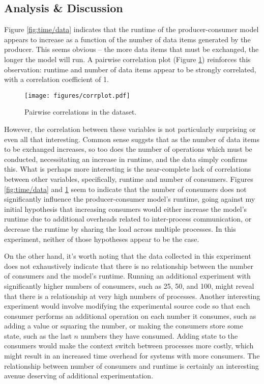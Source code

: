 \documentclass[12pt,a4paper]{article}
\begin{document}
 		\subsection{Analysis \& Discussion}

 			Figure \ref{fig:time/data} indicates that the runtime of the producer-consumer model appears to increase as a function of the number of data items generated by the producer. This seems obvious -- the more data items that must be exchanged, the longer the model will run. A pairwise correlation plot (Figure \ref{fig:corr}) reinforces this observation: runtime and number of data items appear to be strongly correlated, with a correlation coefficient of 1.
				 \begin{figure}[H]
					\centerline{\texttt{[image: figures/corrplot.pdf]}}
					\caption{Pairwise correlations in the dataset.}
					\label{fig:corr}
				\end{figure}

 			However, the correlation between these variables is not particularly surprising or even all that interesting. Common sense suggsts that as the number of data items to be exchanged increases, so too does the number of operations which must be conducted, necessitating an increase in runtime, and the data simply confirms this. What is perhaps more interesting is the near-complete lack of correlations between other variables, specifically, runtime and number of consumers. Figures \ref{fig:time/data} and \ref{fig:corr} seem to indicate that the number of consumers does not significantly influence the producer-consumer model's runtime, going against my initial hypothesis that increasing consumers would either increase the model's runtime due to additional overheads related to inter-process communication, or decrease the runtime by sharing the load across multiple processes. In this experiment, neither of those hypotheses appear to be the case.

 			On the other hand, it's worth noting that the data collected in this experiment does not exhaustively indicate that there is no relationship between the number of consumers and the model's runtime. Running an additional experiment with significantly higher numbers of consumers, such as 25, 50, and 100, might reveal that there is a relationship at very high numbers of processes. Another interesting experiment would involve modifying the experimental source code so that each consumer performs an additional operation on each number it consumes, such as adding a value or squaring the number, or making the consumers store some state, such as the last $n$ numbers they have consumed. Adding state to the consumers would make the context switch between processes more costly, which might result in an increased time overhead for systems with more consumers. The relationship between number of consumers and runtime is certainly an interesting avenue deserving of additional experimentation.
\end{document}
